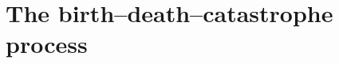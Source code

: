 
\chapter{The birth--death--catastrophe process}
\label{bdc:ch:core}










\begingroup
\omitfromtoc
\renewcommand{\theHsection}{\thechapter.appendix.\Alph{section}}
\renewcommand{\theHsubsection}{\theHsection.\arabic{subsection}}
\renewcommand{\theHsubsubsection}{\theHsubsection.\arabic{subsubsection}}

\endgroup
\restoretoc

